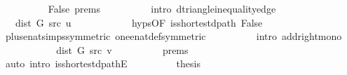 \begin{isabellebody}
\ \ \ \ \ \ \ \ \isamarkupfalse%
\ False\ {\isachardoublequoteopen}{}{\isachardot}{\kern0pt}prems{\isachardoublequoteclose}{\isacharparenleft}{\kern0pt}{}{\isacharparenright}{\kern0pt}\isanewline
\ \ \ \ \ \ \ \ \isamarkupfalse%
\ {\isacharparenleft}{\kern0pt}intro\ d{\isacharunderscore}{\kern0pt}triangle{\isacharunderscore}{\kern0pt}inequality{\isacharunderscore}{\kern0pt}edge{\isacharparenright}{\kern0pt}\isanewline
\ \ \ \ \ \ \isamarkupfalse%
\ \isamarkupfalse%
\ {\isachardoublequoteopen}{\isachardot}{\kern0pt}{\isachardot}{\kern0pt}{\isachardot}{\kern0pt}\ {\isasymle}\ dist\ G\ src\ u\ {\isacharplus}{\kern0pt}\ {}{\isachardoublequoteclose}\isanewline
\ \ \ \ \ \ \ \ \isamarkupfalse%
\ {\isachardoublequoteopen}{}{\isachardot}{\kern0pt}hyps{\isachardoublequoteclose}{\isacharbrackleft}{\kern0pt}OF\ is{\isacharunderscore}{\kern0pt}shortest{\isacharunderscore}{\kern0pt}dpath\ False{\isacharbrackright}{\kern0pt}\isanewline
\ \ \ \ \ \ \ \ \isamarkupfalse%
\ plus{\isacharunderscore}{\kern0pt}enat{\isacharunderscore}{\kern0pt}simps{\isacharparenleft}{\kern0pt}{}{\isacharparenright}{\kern0pt}{\isacharbrackleft}{\kern0pt}symmetric{\isacharbrackright}{\kern0pt}\ one{\isacharunderscore}{\kern0pt}enat{\isacharunderscore}{\kern0pt}def{\isacharbrackleft}{\kern0pt}symmetric{\isacharbrackright}{\kern0pt}\isanewline
\ \ \ \ \ \ \ \ \isamarkupfalse%
\ {\isacharparenleft}{\kern0pt}intro\ add{\isacharunderscore}{\kern0pt}right{\isacharunderscore}{\kern0pt}mono{\isacharparenright}{\kern0pt}\isanewline
\ \ \ \ \ \ \isamarkupfalse%
\ \isamarkupfalse%
\ {\isachardoublequoteopen}{\isachardot}{\kern0pt}{\isachardot}{\kern0pt}{\isachardot}{\kern0pt}\ {\isacharequal}{\kern0pt}\ dist\ G\ src\ v{\isachardoublequoteclose}\isanewline
\ \ \ \ \ \ \ \ \isamarkupfalse%
\ {\isachardoublequoteopen}{}{\isachardot}{\kern0pt}prems{\isachardoublequoteclose}{\isacharparenleft}{\kern0pt}{}{\isacharparenright}{\kern0pt}\isanewline
\ \ \ \ \ \ \ \ \isamarkupfalse%
\ {\isacharparenleft}{\kern0pt}auto\ intro{\isacharcolon}{\kern0pt}\ is{\isacharunderscore}{\kern0pt}shortest{\isacharunderscore}{\kern0pt}dpathE{\isacharunderscore}{\kern0pt}{}{\isacharparenright}{\kern0pt}\isanewline
\ \ \ \ \ \ \isamarkupfalse%
\ \isamarkupfalse%
\ {\isacharquery}{\kern0pt}thesis\isanewline
\ \ \ \ \ \ \ \ \isamarkupfalse%

\end{isabellebody}

